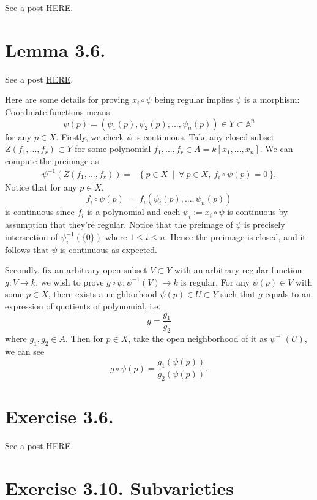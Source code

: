 See a post \href{https://math.stackexchange.com/questions/787770/hartshorne-propositon-i-3-3}{HERE}.

\section{Lemma 3.6.}

See a post \href{https://math.stackexchange.com/questions/457328/hartshorne-lemma-i-3-6}{HERE}.

Here are some details for proving $x_i\circ \psi$ being regular implies $\psi$ is a morphism:
Coordinate functions means 
\[\psi(p)=(\psi_1(p),\psi_2(p),...,\psi_n(p))\in Y\subset \mathbb A^n\] for any $p\in X$.
Firstly, we check $\psi$ is continuous. Take any closed subset $Z(f_1,...,f_r)\subset Y$ for some polynomial $f_1,...,f_r\in A=k[x_1,...,x_n]$. We can compute the preimage as \begin{align*}
    \psi^{-1}(Z(f_1,...,f_r)) =& \{~ p\in X ~\mid ~\forall~ p\in X,~ f_i\circ \psi(p)=0 ~\}.
\end{align*}
Notice that for any $p\in X$, \[f_i\circ \psi(p) ~=~ f_i(\psi_i(p),...,\psi_n(p))\] is continuous since $f_i$ is a polynomial and each $\psi_i:=x_i\circ \psi$ is continuous by assumption that they're regular.
Notice that the preimage of $\psi$ is precisely intersection of $\psi_i^{-1}(\{0\})$ where $1\leq i\leq n$. Hence the preimage is closed, and it follows that $\psi$ is continuous as expected. 

Secondly, fix an arbitrary open subset $V\subset Y$ with an arbitrary regular function $g:V\to k$, we wish to prove $g\circ \psi:\psi^{-1}(V)\to k$ is regular. For any $\psi(p)\in V$ with some $p\in X$, there exists a neighborhood $\psi(p)\in U\subset Y$ such that $g$ equals to an expression of quotients of polynomial, i.e. \[g=\frac{g_1}{g_2}\] where $g_1,g_2\in A$. Then for $p\in X$, take the open neighborhood of it as $\psi^{-1}(U)$, we can see 
\[g\circ \psi (p) = \frac{g_1(\psi(p))}{g_2(\psi(p))}.\]

\section{Exercise 3.6.}

See a post \href{https://math.stackexchange.com/questions/2120717/there-are-quasi-affine-varieties-which-are-not-affine#:~:text=I%20see%20this%20sentence%20in,(0%2C0)%7D.}{HERE}.

\section{Exercise 3.10. \textbf{Subvarieties}}

